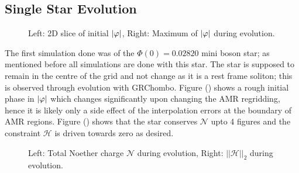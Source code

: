 \subsection{Single Star Evolution}
  \begin{figure}[h!]
  \caption{Left: 2D slice of initial $|\varphi|$, Right: Maximum of $|\varphi|$ during evolution.}
  \centering
  \hfill
\end{figure}
The first simulation done was of the $\Phi(0)=0.02820$ mini boson star; as mentioned before all simulations are done with this star. The star is supposed to remain in the centre of the grid and not change as it is a rest frame soliton; this is observed through evolution with GRChombo. Figure () shows a rough initial phase in $|\varphi|$ which changes significantly upon changing the AMR regridding, hence it is likely only a side effect of the interpolation errors at the boundary of AMR regions. Figure () shows that the star conserves $\mathcal{N}$ upto 4 figures and the constraint $\mathcal{H}$ is driven towards zero as desired.

  \begin{figure}[h!]
  \caption{Left: Total Noether charge $\mathcal{N}$ during evolution, Right: $|| \mathcal{H} ||_2$ during evolution.}
  \centering
  \hfill
\end{figure}



